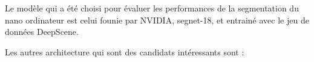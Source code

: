 ﻿\par Le modèle qui a été choisi pour évaluer les performances de la segmentation du nano ordinateur est celui founie par NVIDIA, segnet-18, et entrainé avec le jeu de données DeepScene. 
\par Les autres architecture qui sont des candidats intéressants sont :